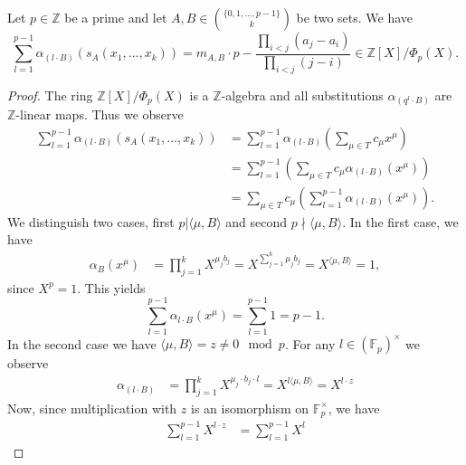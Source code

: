 \documentclass[10pt,a4paper]{amsart}
\newcommand{\F}{\mathbb{F}}
\newcommand{\Z}{\ensuremath{\mathbb{Z}}}
\begin{document}
\begin{lemma}\label{EvaluationSumOfSchur}
    Let $p\in \Z$ be a prime and let $A,B \in \binom{\{0,1,\ldots,p-1\}}{k}$ be two sets.
    We have
    \[
    \sum_{l=1}^{p-1}\alpha_{(l \cdot B)}(s_A(x_1,\ldots,x_k)) = m_{A,B} \cdot p - \frac{\prod_{i<j}(a_j-a_i)}{\prod_{i<j}(j-i)} \in \Z[X]/\Phi_p(X).
    \]
\end{lemma}

\begin{proof}
    The ring $\Z[X]/\Phi_p(X)$ is a $\Z$-algebra and all substitutions $\alpha_{(q^l\cdot B)}$ are $\Z$-linear maps. Thus we observe
    \begin{align*}
        \sum_{l=1}^{p-1}\alpha_{(l \cdot B)}(s_A(x_1,\ldots,x_k))&=
        \sum_{l=1}^{p-1}\alpha_{(l \cdot B)}\left(\sum_{\mu \in T}c_\mu x^\mu\right) \\
        &= \sum_{l=1}^{p-1}\left( \sum_{\mu \in T} c_\mu\alpha_{(l \cdot B)} (x^\mu)  \right)\\
        &= \sum_{\mu \in T}c_\mu\left( \sum_{l=1}^{p-1} \alpha_{(l \cdot B)} (x^\mu)  \right).
    \end{align*}
We distinguish two cases, first $p | \langle \mu , B \rangle$ and second $p \nmid \langle \mu, B \rangle$. In the first case, we have
\begin{align*}
    \alpha_{B}(x^\mu) &= \prod_{j=1}^k X^{\mu_j b_j} %
    = X^{\sum_{j=1}^k \mu_j b_j} %
    = X^{\langle \mu , B \rangle} %
    = 1,
\end{align*}
since $X^p=1$. This yields 
\[\sum_{l=1}^{p-1}\alpha_{l\cdot B}(x^\mu)=\sum_{l=1}^{p-1}1=p-1.\]
In the second case we have $\langle \mu, B \rangle = z\neq   0 \mod p$. For any $l \in (\F_p)^\times$ we observe
\begin{align*}
    \alpha_{(l \cdot B)}&=\prod_{j=1}^kX^{\mu_j \cdot b_j\cdot l} %
    = X^{l \langle \mu , B \rangle} %
    = X^{l \cdot z}
\end{align*}
Now, since multiplication with $z$ is an isomorphism on $\F_p^\times$, we have
\begin{align*}
    \sum_{l=1}^{p-1}X^{l \cdot z} &= \sum_{l=1}^{p-1}X^l 

\end{align*}
\end{proof}
\end{document}

